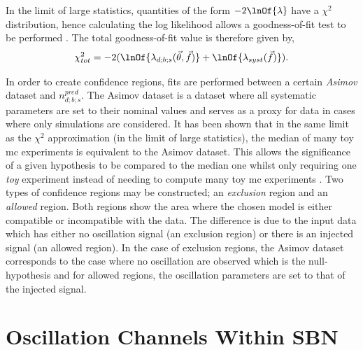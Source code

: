 In the limit of large statistics, quantities of the form $-2\lnOf{\lambda}$ have a $\chi^2$ distribution, hence calculating the log likelihood allows a goodness-of-fit test to be performed \cite{introduction_to_mathematical_statistics_book}. The total goodness-of-fit value is therefore given by,
\begin{equation}
    \chi^2_{tot} = -2(\lnOf{\lambda_{d;b;s}(\vec{\theta}, \vec{f})} + \lnOf{\lambda_{syst}(\vec{f})}).
\end{equation}

In order to create confidence regions, fits are performed between a certain \textit{Asimov} dataset and $n_{d;b;s}^{pred}$. The Asimov dataset is a dataset where all systematic parameters are set to their nominal values and serves as a proxy for data in cases where only simulations are considered. It has been shown that in the same limit as the $\chi^2$ approximation (in the limit of large statistics), the median of many toy \gls{mc} experiments is equivalent to the Asimov dataset. This allows the significance of a given hypothesis to be compared to the median one whilst only requiring one \textit{toy} experiment instead of needing to compute many toy \gls{mc} experiments \cite{Asimov_dataset}. Two types of confidence regions may be constructed; an \textit{exclusion} region and an \textit{allowed} region. Both regions show the area where the chosen model is either compatible or incompatible with the data. The difference is due to the input data which has either no oscillation signal (an exclusion region) or there is an injected signal (an allowed region). In the case of exclusion regions, the Asimov dataset corresponds to the case where no oscillation are observed which is the null-hypothesis and for allowed regions, the oscillation parameters are set to that of the injected signal. %

\section{Oscillation Channels Within SBN}

